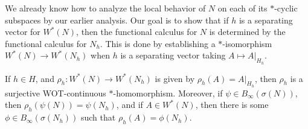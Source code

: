 \documentclass[10pt]{mypackage}
\begin{document}
We already know how to analyze the local behavior of $N$ on each of its $\ast$-cyclic subspaces by our earlier analysis. Our goal is to show that if $h$ is a separating vector for $W^{\ast}\left( N \right)$, then the functional calculus for $N$ is determined by the functional calculus for $N_h$. This is done by establishing a $\ast$-isomorphism $W^{\ast}\left( N \right)\to W^{\ast}\left( N_h \right)$ when $h$ is a separating vector taking $A\mapsto A|_{H_h}$.
\begin{lemma}
  If $h\in H$, and $\rho_h\colon W^{\ast}\left( N \right)\to W^{\ast}\left( N_h \right)$ is given by $\rho_h(A) = A|_{H_h}$, then $\rho_h$ is a surjective WOT-continuous $\ast$-homomorphism. Moreover, if $\psi\in B_{\infty}\left( \sigma(N) \right)$, then $\rho_h\left( \psi(N) \right) = \psi\left( N_h \right)$, and if $A\in W^{\ast}\left( N \right)$, then there is some $\phi\in B_{\infty}\left( \sigma\left( N_h \right) \right)$ such that $\rho_h\left( A \right) = \phi\left( N_h \right)$.
\end{lemma}
\end{document}
